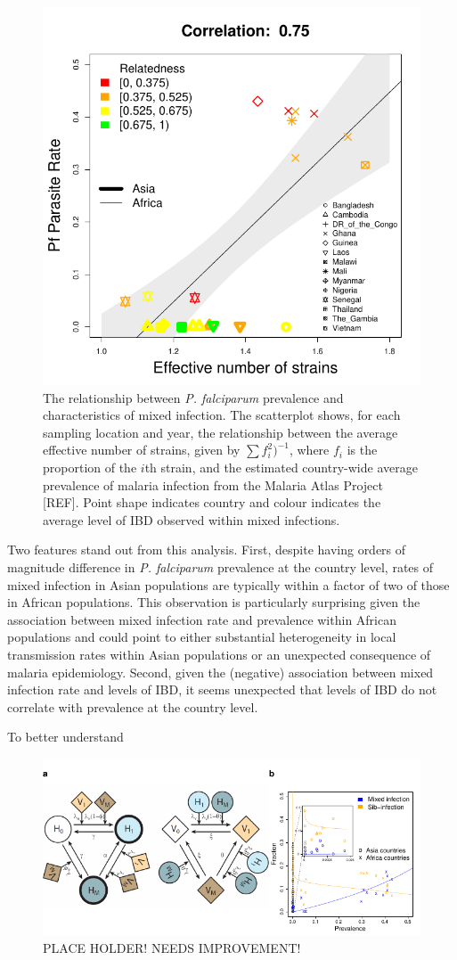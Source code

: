 \documentclass[9pt,lineno]{elife}
\begin{document}
\begin{figure}[ht]
  \centering{}
    \includegraphics[width=.5\textwidth]{Fig4.pdf}
  \caption{The relationship between {\it P. falciparum} prevalence and characteristics of mixed infection.  The scatterplot shows, for each sampling location and year, the relationship between the average effective number of strains, given by $\sum f_i^2)^{-1}$, where $f_i$ is the proportion of the $i$th strain, and the estimated country-wide average prevalence of malaria infection from the Malaria Atlas Project [REF].  Point shape indicates country and colour indicates the average level of IBD observed within mixed infections. }
  \label{fig:pfpr}
\end{figure}

Two features stand out from this analysis.  First, despite having orders of magnitude difference in {\it P. falciparum} prevalence at the country level, rates of mixed infection in Asian populations are typically within a factor of two of those in African populations.  This observation is particularly surprising given the association between mixed infection rate and prevalence within African populations and could point to either substantial heterogeneity in local transmission rates within Asian populations or an unexpected consequence of malaria epidemiology.  Second, given the (negative) association between mixed infection rate and levels of IBD, it seems unexpected that levels of IBD do not correlate with prevalence at the country level.

To better understand 

\begin{figure}[ht]
  \centering{}
  \includegraphics[width=\textwidth]{Fig5.pdf}
  \caption{PLACE HOLDER! NEEDS IMPROVEMENT!}
  \label{fig:model}
\end{figure}
\end{document}
